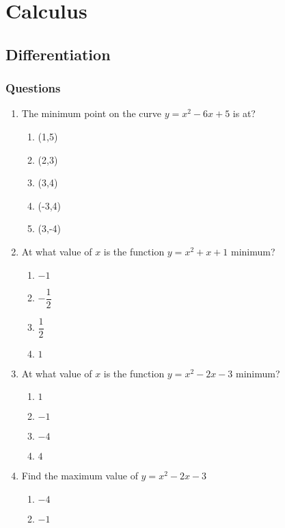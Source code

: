 \chapter{Calculus}
\section{Differentiation}
\subsection{Questions}
\begin{multicols}{2}
\begin{enumerate}[label={\arabic*.}]
  \item The minimum point on the curve \(y = {x}^{2} - 6x + 5\) is at?
        \begin{enumerate}[label={\Alph*.}]
            \item (1,5)
            \item (2,3)
            \item (3,4)
            \item (-3,4)
            \item (3,-4)
        \end{enumerate}
  \item At what value of \(x\) is the function \(y = {x}^{2} + x + 1\) minimum? 
        \begin{enumerate}[label={\Alph*.}]
            \item \(-1\)
            \item \(-\dfrac{1}{2}\)
            \item \(\dfrac{1}{2}\)
            \item \(1\)
        \end{enumerate}
  \item At what value of \(x\) is the function \(y = {x}^{2} - 2x - 3\) minimum?
    \begin{enumerate}[label={\Alph*.}]
            \item \(1\) 
            \item \(-1\) 
            \item \(-4\)
            \item \(4\)
        \end{enumerate}
  \item Find the maximum value of \(y = {x}^{2} - 2x - 3\)
        \begin{enumerate}[label={\Alph*.}]
			\item \(-4\)
			\item \(-1\)

\end{enumerate}
\end{enumerate}
\end{multicols}
